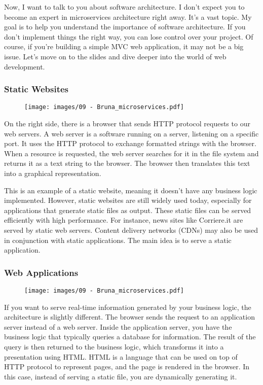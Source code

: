 Now, I want to talk to you about software architecture. I don't expect
you to become an expert in microservices architecture right away. It's a
vast topic. My goal is to help you understand the importance of software
architecture. If you don't implement things the right way, you can lose
control over your project. Of course, if you're building a simple MVC
web application, it may not be a big issue. Let's move on to the slides
and dive deeper into the world of web development.

\subsubsection{Static Websites}

\begin{figure}[!h]
    \centering
    \texttt{[image: images/09 - Bruna\_microservices.pdf]}
\end{figure}

On the right side, there is a browser that sends HTTP protocol requests
to our web servers. A web server is a software running on a server,
listening on a specific port. It uses the HTTP protocol to exchange
formatted strings with the browser. When a resource is requested, the
web server searches for it in the file system and returns it as a text
string to the browser. The browser then translates this text into a
graphical representation.

This is an example of a static website, meaning it doesn't have any
business logic implemented. However, static websites are still widely
used today, especially for applications that generate static files as
output. These static files can be served efficiently with high
performance. For instance, news sites like Corriere.it are served by
static web servers. Content delivery networks (CDNs) may also be used in
conjunction with static applications. The main idea is to serve a static
application.

\subsubsection{Web Applications}

\begin{figure}[!h]
    \centering
    \texttt{[image: images/09 - Bruna\_microservices.pdf]}
\end{figure}

If you want to serve real-time information generated by your business
logic, the architecture is slightly different. The browser sends the
request to an application server instead of a web server. Inside the
application server, you have the business logic that typically queries a
database for information. The result of the query is then returned to
the business logic, which transforms it into a presentation using
HTML. HTML is a language that can be used on top of HTTP protocol to
represent pages, and the page is rendered in the browser. In this case,
instead of serving a static file, you are dynamically generating it.

